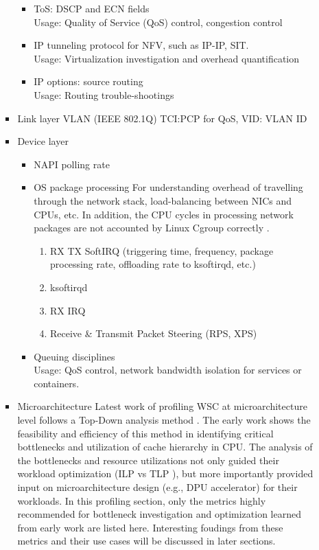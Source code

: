 \begin{itemize}
\begin{itemize}
\begin{itemize}
\begin{itemize}
        \item {ToS: DSCP and ECN fields} \\
            Usage: Quality of Service (QoS) control, congestion control \autocite{DBLP:conf/sigcomm/AlizadehGMPPPSS10}
        \item IP tunneling protocol for NFV, such as IP-IP, SIT. \\
            Usage: Virtualization investigation and overhead quantification
        \item IP options: source routing \\
            Usage: Routing trouble-shootings
        \end{itemize}
   \item Link layer
      VLAN (IEEE 802.1Q) \autocite{url/ieee802.1q} TCI:PCP for QoS, VID: VLAN ID
   \item Device layer
      \begin{itemize}
        \item NAPI polling rate
        \item OS package processing
          For understanding overhead of travelling through the network stack, load-balancing between NICs and CPUs, etc.
          In addition, the CPU cycles in processing network packages are not accounted by Linux Cgroup correctly \autocite{DBLP:conf/nsdi/KhalidRFXRFA18}.
            \begin{enumerate}
            \item RX TX SoftIRQ (triggering time, frequency, package processing rate, offloading rate to ksoftirqd, etc.)
            \item ksoftirqd
            \item RX IRQ
            \item Receive \& Transmit Packet Steering (RPS, XPS)
           \end{enumerate}
        \item Queuing disciplines \\
          Usage: QoS control, network bandwidth isolation for services or containers.
      \end{itemize}

  \item Microarchitecture
    Latest work of profiling WSC at microarchitecture level \autocite{DBLP:conf/asplos/FerdmanAKVAJKPAF12, DBLP:journals/micro/KanevDHRMWB16} follows a Top-Down analysis method \autocite{DBLP:conf/ispass/Yasin14}. The early work shows the feasibility and efficiency of this method in identifying critical bottlenecks and utilization of cache hierarchy in CPU.
    The analysis of the bottlenecks and resource utilizations not only guided their workload optimization (ILP vs TLP \autocite{DBLP:journals/micro/KanevDHRMWB16}), but more importantly provided input on microarchitecture design (e.g., DPU accelerator) for their workloads.
    In this profiling section, only the metrics highly recommended for bottleneck investigation and optimization learned from early work are listed here. Interesting foudings from these metrics and their use cases will be discussed in later sections.


\end{itemize}
\end{itemize}
\end{itemize}
